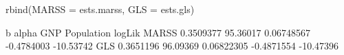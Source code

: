 \begin{Schunk}
\begin{Sinput}
 rbind(MARSS = ests.marss, GLS = ests.gls)
\end{Sinput}
\begin{Soutput}
              b    alpha        GNP Population    logLik
MARSS 0.3509377 95.36017 0.06748567 -0.4784003 -10.53742
GLS   0.3651196 96.09369 0.06822305 -0.4871554 -10.47396
\end{Soutput}
\end{Schunk}
